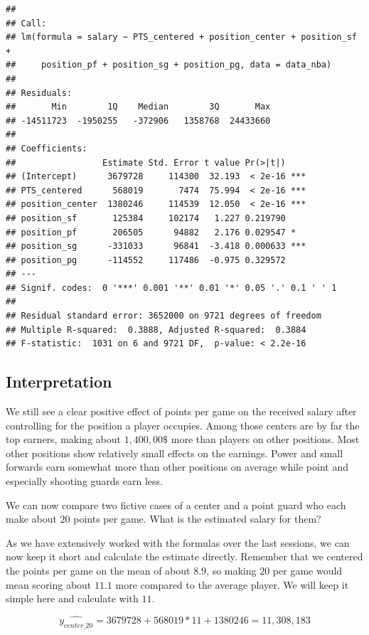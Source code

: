 \documentclass[
]{book}
\begin{document}
\begin{verbatim}
## 
## Call:
## lm(formula = salary ~ PTS_centered + position_center + position_sf + 
##     position_pf + position_sg + position_pg, data = data_nba)
## 
## Residuals:
##       Min        1Q    Median        3Q       Max 
## -14511723  -1950255   -372906   1358768  24433660 
## 
## Coefficients:
##                 Estimate Std. Error t value Pr(>|t|)    
## (Intercept)      3679728     114300  32.193  < 2e-16 ***
## PTS_centered      568019       7474  75.994  < 2e-16 ***
## position_center  1380246     114539  12.050  < 2e-16 ***
## position_sf       125384     102174   1.227 0.219790    
## position_pf       206505      94882   2.176 0.029547 *  
## position_sg      -331033      96841  -3.418 0.000633 ***
## position_pg      -114552     117486  -0.975 0.329572    
## ---
## Signif. codes:  0 '***' 0.001 '**' 0.01 '*' 0.05 '.' 0.1 ' ' 1
## 
## Residual standard error: 3652000 on 9721 degrees of freedom
## Multiple R-squared:  0.3888, Adjusted R-squared:  0.3884 
## F-statistic:  1031 on 6 and 9721 DF,  p-value: < 2.2e-16
\end{verbatim}

\hypertarget{interpretation-1}{%
\subsection{Interpretation}\label{interpretation-1}}

We still see a clear positive effect of points per game on the received salary
after controlling for the position a player occupies. Among those centers are by
far the top earners, making about \(1,400,00\$\) more than players on other
positions. Most other positions show relatively small effects on the earnings.
Power and small forwards earn somewhat more than other positions on average
while point and especially shooting guards earn less.

We can now compare two fictive cases of a center and a point guard who each make
about \(20\) points per game. What is the estimated salary for them?

As we have extensively worked with the formulas over the last sessions, we can
now keep it short and calculate the estimate directly. Remember that we
centered the points per game on the mean of about \(8.9\), so making \(20\) per game
would mean scoring about \(11.1\) more compared to the average player. We will keep it simple
here and calculate with \(11\).

\[\hat{y_{center\_20}} = 3679728 + 568019 * 11 + 1380246 = 11,308,183\]
\end{document}
